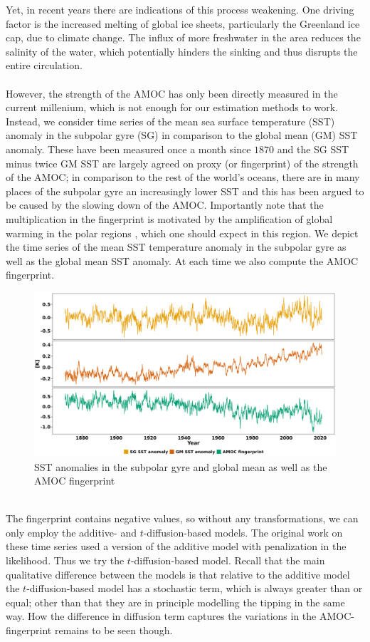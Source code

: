 Yet, in recent years there are indications of this process weakening. One driving factor is the increased melting of global ice sheets, particularly the Greenland ice cap, due to climate change. The influx of more freshwater in the area reduces the salinity of the water, which potentially hinders the sinking and thus disrupts the entire circulation. \\\\
However, the strength of the AMOC has only been directly measured in the current millenium, which is not enough for our estimation methods to work. Instead, we consider time series of the mean sea surface temperature (SST) anomaly in the subpolar gyre (SG) in comparison to the global mean (GM) SST anomaly. These have been measured once a month since $1870$ and the SG SST minus twice GM SST are largely agreed on proxy (or fingerprint) of the strength of the AMOC; in comparison to the rest of the world's oceans, there are in many places of the subpolar gyre an increasingly lower SST and this has been argued to be caused by the slowing down of the AMOC. Importantly note that the multiplication in the fingerprint is motivated by the amplification of global warming in the polar regions \cite[caption of Figure 1]{Ditlevsen2023}, which one should expect in this region.
\noindent We depict the time series of the mean SST temperature anomaly in the subpolar gyre as well as the global mean SST anomaly. At each time we also compute the AMOC fingerprint.
\begin{figure}[h!]
    \begin{center}
    \includegraphics[scale = .06]{figures/AMOC_data_plot.jpeg}
    \caption{SST anomalies in the subpolar gyre and global mean as well as the AMOC fingerprint}
    \label{figure:AMOC_plot}
    \end{center}
\end{figure}\\
The fingerprint contains negative values, so without any transformations, we can only employ the additive- and $t$-diffusion-based models. The original work on these time series \cite{Ditlevsen2023} used a version of the additive model with penalization in the likelihood. Thus we try the $t$-diffusion-based model. Recall that the main qualitative difference between the models is that relative to the additive model the $t$-diffusion-based model has a stochastic term, which is always greater than or equal; other than that they are in principle modelling the tipping in the same way. How the difference in diffusion term captures the variations in the AMOC-fingerprint remains to be seen though.
